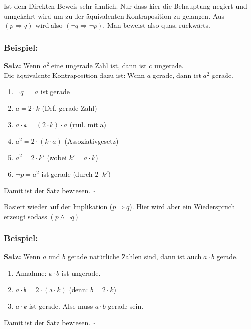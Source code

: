 \begin{framed} [Kontraposition]
  Ist dem Direkten Beweis sehr ähnlich. Nur dass hier die Behauptung negiert und
  umgekehrt wird um zu der äquivalenten Kontraposition zu gelangen. Aus 
  $(p \Rightarrow q)$ wird also $(\neg q \Rightarrow \neg p)$. Man beweist also 
  quasi rückwärts.

  \subsubsection*{Beispiel:}
  \textbf{Satz:} \dq{}Wenn $a^2$ eine ungerade Zahl ist, dann ist $a$ ungerade\dq{}.\\
  Die äquivalente Kontraposition dazu ist:
  \dq{}Wenn $a$ gerade, dann ist $a^2$ gerade\dq{}.
  \begin{enumerate}
    \item $\neg q =$ \glqq $a$ ist gerade\grqq
    \item $a = 2 \cdot k$ (Def. gerade Zahl)
    \item $a \cdot a = (2 \cdot k) \cdot a$ (mul. mit a)
    \item $a^2 = 2 \cdot (k \cdot a)$ (Assoziativgesetz)
    \item $a^2 = 2 \cdot k'$ (wobei $k' = a \cdot k$)
    \item $\neg p = a^2$ ist gerade (durch $2 \cdot k'$)
  \end{enumerate}
  Damit ist der Satz bewiesen. $\square$
\end{framed}


\begin{framed} [Wiederspruch]
  Basiert wieder auf der Implikation ($p \Rightarrow q$). Hier wird aber ein 
  Wiederspruch erzeugt sodass $(p \wedge \neg q)$

  \subsubsection*{Beispiel:}
  \textbf{Satz:} \dq{}Wenn $a$ und $b$ gerade natürliche Zahlen sind, dann ist
  auch $a \cdot b$ gerade\dq{}.
  \begin{enumerate}
    \item Annahme: $a \cdot b$ ist ungerade.
    \item $a \cdot b = 2 \cdot (a \cdot k)$ (denn: $b = 2 \cdot k$)
    \item $a \cdot k$ ist gerade. Also muss $a \cdot b$ gerade sein.
  \end{enumerate}
  Damit ist der Satz bewiesen. $\square$
\end{framed}


